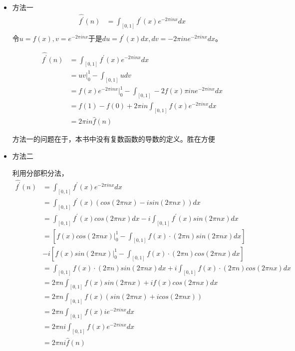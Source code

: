 \documentclass{article}
\begin{document}
\begin{itemize}
  \item 方法一
        \begin{align*}
          \hat{f^\prime}(n)
           & = \int_{[0, 1]} f^\prime(x) e^{-2\pi i nx} dx \\
        \end{align*}
        令$u = f(x), v = e^{-2\pi i nx}$于是$du = f^\prime (x)dx, dv = -2\pi i n e^{-2\pi i nx}dx$。

        \begin{align*}
          \hat{f^\prime}(n)
           & = \int_{[0, 1]} f^\prime(x) e^{-2\pi i nx} dx                                  \\
           & = uv|_{0}^1 - \int_{[0, 1]} u dv                                               \\
           & = f(x) e^{-2\pi i nx} |_{0}^1 - \int_{[0, 1]} -2 f(x) \pi i n e^{-2\pi i nx}dx \\
           & = f(1) - f(0) + 2\pi i n \int_{[0, 1]} f(x) e^{-2\pi i nx}dx                   \\
           & = 2\pi i n \hat{f}(n)
        \end{align*}

        方法一的问题在于，本书中没有复数函数的导数的定义。胜在方便

  \item 方法二

        利用分部积分法，
        \begin{align*}
          \hat{f^\prime}(n)
           & = \int_{[0, 1]} f^\prime(x) e^{-2\pi i nx} dx                                                          \\
           & = \int_{[0, 1]} f^\prime(x) (cos(2\pi nx) - isin(2\pi nx)) dx                                          \\
           & = \int_{[0, 1]} f^\prime(x) cos(2\pi nx)dx - i \int_{[0, 1]} f^\prime(x) sin(2\pi nx)dx                \\
           & = \left[f(x)cos(2\pi n x)|_0^1 - \int_{[0, 1]} f(x) \cdot (2\pi n)sin(2\pi n x)dx\right]               \\
           & - i\left[f(x)sin(2\pi n x)|_0^1 - \int_{[0, 1]} f(x) \cdot (2\pi n)cos(2\pi n x)dx\right]              \\
           & = \int_{[0, 1]} f(x) \cdot (2\pi n)sin(2\pi n x)dx + i\int_{[0, 1]} f(x) \cdot (2\pi n)cos(2\pi n x)dx \\
           & = 2\pi n \int_{[0, 1]} f(x) sin(2\pi n x) + if(x)cos(2\pi n x) dx                                      \\
           & = 2\pi n \int_{[0, 1]} f(x)(sin(2\pi n x) + icos(2\pi n x))                                            \\
           & = 2\pi n \int_{[0, 1]} f(x)ie^{-2\pi i nx} dx                                                          \\
           & = 2\pi n i \int_{[0, 1]} f(x)e^{-2\pi i nx} dx                                                         \\
           & = 2\pi n i \hat{f}(n)
        \end{align*}


\end{itemize}
\end{document}
